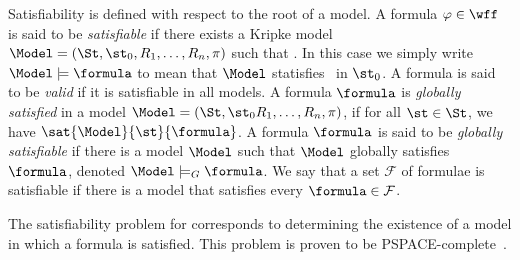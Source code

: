 
Satisfiability is defined with respect to the root of a model. A formula
$\varphi \in \wff$ is said to be \emph{satisfiable} if there exists a Kripke
model $\Model = (\St, \st_0, R_1, \ldots, R_n, \pi)$ such that
. In this case we simply write $\Model \models
\formula$ to mean that $\Model$ statisfies \formula~in $\st_0$. A formula is
said to be \emph{valid} if it is satisfiable in all models.  A formula
$\formula$ is \emph{globally satisfied} in a model $\Model = (\St, \st_0 R_1,
\ldots, R_n, \pi)$, if for all $\st \in \St$, we have
$\sat{\Model}{\st}{\formula}$. A formula $\formula$ is said to be \emph{globally
satisfiable} if there is a model $\Model$ such that $\Model$ globally satisfies
$\formula$, denoted $\Model \models_G \formula$.  We say that a set
$\mathcal{F}$ of formulae is satisfiable if there is a model that satisfies
every $\formula \in \mathcal{F}$.

The satisfiability problem for  corresponds to determining the
existence of a model in which a formula is satisfied. This problem is proven to be
PSPACE-complete~\cite{Spaan:coml}.

